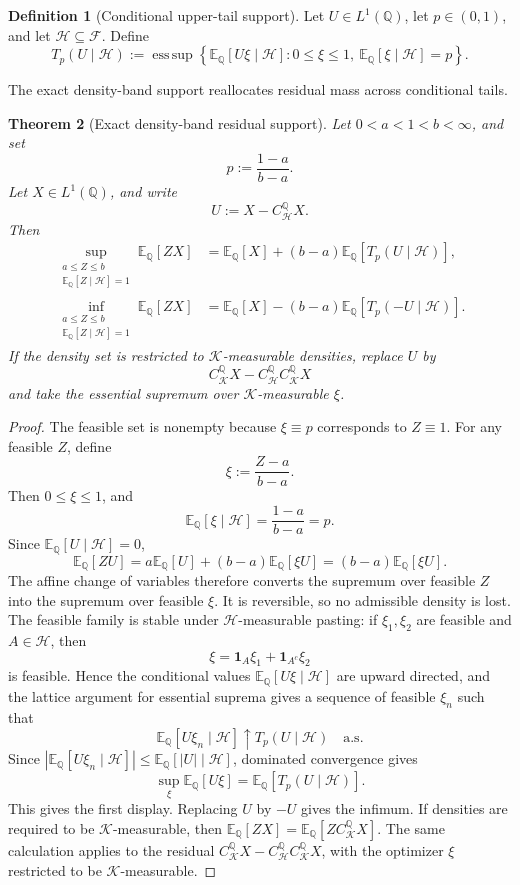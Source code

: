 \documentclass[11pt,a4paper]{amsart}
\theoremstyle{plain}
\newtheorem{theorem}{Theorem}[section]
\theoremstyle{definition}
\newtheorem{definition}[theorem]{Definition}
\theoremstyle{remark}
\DeclareMathOperator{\esssup}{ess\,sup}
\newcommand{\QQ}{\mathbb{Q}}
\newcommand{\EE}{\mathbb{E}}
\newcommand{\cF}{\mathcal{F}}
\newcommand{\cH}{\mathcal{H}}
\newcommand{\cK}{\mathcal{K}}
\newcommand{\one}{\mathbf{1}}
\begin{document}
\begin{definition}[Conditional upper-tail support]\label{def:conditional-upper-tail-support}
Let \(U\in L^1(\QQ)\), let \(p\in(0,1)\), and let \(\cH\subseteq\cF\).  Define
\[
        T_p(U\mid\cH)
        :=
        \esssup\left\{
        \EE_\QQ[U\xi\mid\cH]:
        0\le\xi\le1,\ 
        \EE_\QQ[\xi\mid\cH]=p
        \right\}.
\]
\end{definition}

The exact density-band support reallocates residual mass across conditional tails.

\begin{theorem}[Exact density-band residual support]\label{thm:density-band-exact-support}
Let \(0<a<1<b<\infty\), and set
\[
        p:=\frac{1-a}{b-a}.
\]
Let \(X\in L^1(\QQ)\), and write
\[
        U:=X-C_{\cH}^{\QQ}X.
\]
Then
\[
\begin{aligned}
        \sup_{\substack{a\le Z\le b\\ \EE_\QQ[Z\mid\cH]=1}}
        \EE_\QQ[ZX]
        &=
        \EE_\QQ[X]
        +(b-a)\EE_\QQ[T_p(U\mid\cH)],\\
        \inf_{\substack{a\le Z\le b\\ \EE_\QQ[Z\mid\cH]=1}}
        \EE_\QQ[ZX]
        &=
        \EE_\QQ[X]
        -(b-a)\EE_\QQ[T_p(-U\mid\cH)].
\end{aligned}
\]
If the density set is restricted to \(\cK\)-measurable densities, replace \(U\) by
\[
        C_{\cK}^{\QQ}X-C_{\cH}^{\QQ}C_{\cK}^{\QQ}X
\]
and take the essential supremum over \(\cK\)-measurable \(\xi\).
\end{theorem}

\begin{proof}
The feasible set is nonempty because \(\xi\equiv p\) corresponds to \(Z\equiv1\).  For any
feasible \(Z\), define
\[
        \xi:=\frac{Z-a}{b-a}.
\]
Then \(0\le\xi\le1\), and
\[
        \EE_\QQ[\xi\mid\cH]
        =
        \frac{1-a}{b-a}
        =p.
\]
Since \(\EE_\QQ[U\mid\cH]=0\),
\[
        \EE_\QQ[ZU]
        =
        a\EE_\QQ[U]+(b-a)\EE_\QQ[\xi U]
        =
        (b-a)\EE_\QQ[\xi U].
\]
The affine change of variables therefore converts the supremum over feasible \(Z\) into the
supremum over feasible \(\xi\).  It is reversible, so no admissible density is lost.  The
feasible family is stable under \(\cH\)-measurable pasting: if \(\xi_1,\xi_2\) are feasible and
\(A\in\cH\), then
\[
        \xi=\one_A\xi_1+\one_{A^c}\xi_2
\]
is feasible.  Hence the conditional values \(\EE_\QQ[U\xi\mid\cH]\) are upward directed, and
the lattice argument for essential suprema gives a sequence of feasible \(\xi_n\) such that
\[
        \EE_\QQ[U\xi_n\mid\cH]\uparrow T_p(U\mid\cH)
        \quad\text{a.s.}
\]
Since \(|\EE_\QQ[U\xi_n\mid\cH]|\le \EE_\QQ[|U|\mid\cH]\), dominated convergence gives
\[
        \sup_{\xi}\EE_\QQ[U\xi]
        =
        \EE_\QQ[T_p(U\mid\cH)].
\]
This gives the first display.  Replacing \(U\) by \(-U\) gives the infimum.
If densities are required to be \(\cK\)-measurable, then
\(\EE_\QQ[ZX]=\EE_\QQ[ZC_{\cK}^{\QQ}X]\).  The same calculation applies to the residual
\(C_{\cK}^{\QQ}X-C_{\cH}^{\QQ}C_{\cK}^{\QQ}X\), with the optimizer \(\xi\) restricted to be
\(\cK\)-measurable.
\end{proof}
\end{document}
